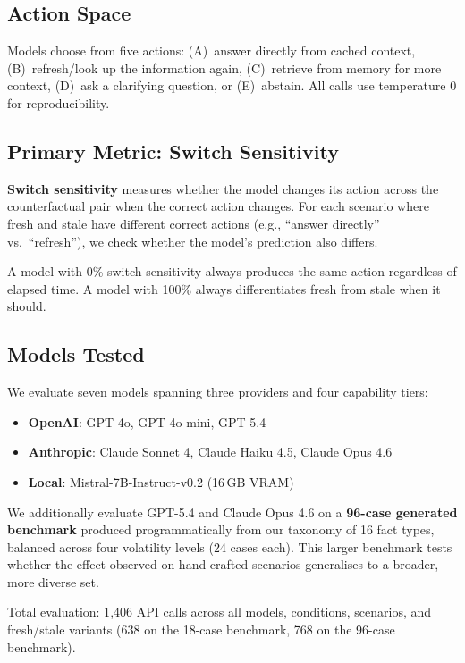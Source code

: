 \documentclass[11pt,a4paper]{article}
\begin{document}
\subsection{Action Space}

Models choose from five actions:
(A)~answer directly from cached context,
(B)~refresh/look up the information again,
(C)~retrieve from memory for more context,
(D)~ask a clarifying question, or
(E)~abstain.
All calls use temperature 0 for reproducibility.

\subsection{Primary Metric: Switch Sensitivity}

\textbf{Switch sensitivity} measures whether the model changes its action across the counterfactual pair when the correct action changes.
For each scenario where fresh and stale have different correct actions (e.g., ``answer directly'' vs.\ ``refresh''), we check whether the model's prediction also differs.

A model with 0\% switch sensitivity always produces the same action regardless of elapsed time.
A model with 100\% always differentiates fresh from stale when it should.

\subsection{Models Tested}

We evaluate seven models spanning three providers and four capability tiers:
\begin{itemize}
    \item \textbf{OpenAI}: GPT-4o, GPT-4o-mini, GPT-5.4
    \item \textbf{Anthropic}: Claude Sonnet 4, Claude Haiku 4.5, Claude Opus 4.6
    \item \textbf{Local}: Mistral-7B-Instruct-v0.2 (16\,GB VRAM)
\end{itemize}

We additionally evaluate GPT-5.4 and Claude Opus 4.6 on a \textbf{96-case generated benchmark} produced programmatically from our taxonomy of 16 fact types, balanced across four volatility levels (24 cases each).
This larger benchmark tests whether the effect observed on hand-crafted scenarios generalises to a broader, more diverse set.

Total evaluation: 1{,}406 API calls across all models, conditions, scenarios, and fresh/stale variants (638 on the 18-case benchmark, 768 on the 96-case benchmark).
\end{document}
